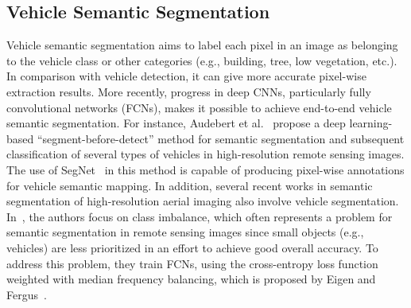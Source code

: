 \documentclass[journal]{IEEEtran}
\begin{document}
\subsection{Vehicle Semantic Segmentation}
Vehicle semantic segmentation aims to label each pixel in an image as belonging to the vehicle class or other categories (e.g., building, tree, low vegetation, etc.). In comparison with vehicle detection, it can give more accurate pixel-wise extraction results. More recently, progress in deep CNNs, particularly fully convolutional networks (FCNs), makes it possible to achieve end-to-end vehicle semantic segmentation. For instance, Audebert et al.~\cite{AudebertRS17} propose a deep learning-based ``segment-before-detect'' method for semantic segmentation and subsequent classification of several types of vehicles in high-resolution remote sensing images. The use of SegNet~\cite{SegNet} in this method is capable of producing pixel-wise annotations for vehicle semantic mapping. In addition, several recent works in semantic segmentation of high-resolution aerial imaging also involve vehicle segmentation. In~\cite{Kampffmeyer16}, the authors focus on class imbalance, which often represents a problem for semantic segmentation in remote sensing images since small objects (e.g., vehicles) are less prioritized in an effort to achieve good overall accuracy. To address this problem, they train FCNs, using the cross-entropy loss function weighted with median frequency balancing, which is proposed by Eigen and Fergus~\cite{Eigen15}.
\end{document}
